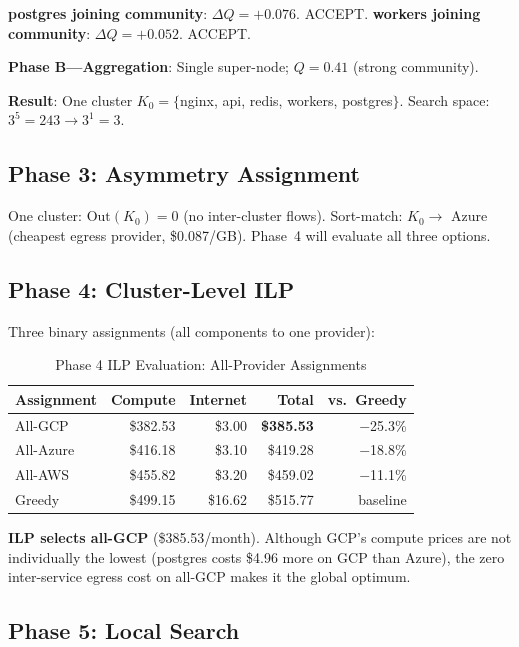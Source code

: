 \documentclass[10pt,journal]{IEEEtran}
\begin{document}
\textbf{postgres joining community}: $\Delta Q = +0.076$. ACCEPT.
\textbf{workers joining community}: $\Delta Q = +0.052$. ACCEPT.

\textbf{Phase B---Aggregation}: Single super-node; $Q = 0.41$ (strong community).

\textbf{Result}: One cluster $K_0 = \{$nginx, api, redis, workers, postgres$\}$.
Search space: $3^5 = 243 \to 3^1 = 3$.

\subsection{Phase 3: Asymmetry Assignment}

One cluster: $\text{Out}(K_0) = 0$ (no inter-cluster flows).
Sort-match: $K_0 \to$ Azure (cheapest egress provider, \$0.087/GB).
Phase~4 will evaluate all three options.

\subsection{Phase 4: Cluster-Level ILP}

Three binary assignments (all components to one provider):

\begin{table}[ht]
\centering
\caption{Phase 4 ILP Evaluation: All-Provider Assignments}
\label{tab:cc_ilp}
\setlength{\tabcolsep}{4pt}
\begin{tabular}{lrrrr}
\toprule
Assignment & Compute & Internet & \textbf{Total} & vs.\ Greedy\\
\midrule
\rowcolor{green!15}
All-GCP  & \$382.53 & \$3.00 & \textbf{\$385.53} & $-$25.3\%\\
All-Azure& \$416.18 & \$3.10 & \$419.28 & $-$18.8\%\\
All-AWS  & \$455.82 & \$3.20 & \$459.02 & $-$11.1\%\\
Greedy   & \$499.15 & \$16.62& \$515.77 & baseline\\
\bottomrule
\end{tabular}
\end{table}

\textbf{ILP selects all-GCP} (\$385.53/month).
Although GCP's compute prices are not individually the lowest (postgres costs
\$4.96 more on GCP than Azure), the zero inter-service egress cost on all-GCP
makes it the global optimum.

\subsection{Phase 5: Local Search}
\end{document}
